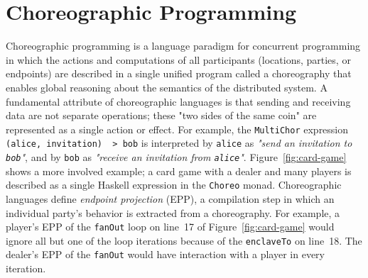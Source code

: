 \documentclass[sigplan,screen,review,anonymous]{acmart}
\newcommand{\inlinecode}[2][haskell]{\texttt{#2}}
\newcommand{\MultiChor}{\texttt{Multi\-Chor}\xspace}
\begin{document}
\section{Choreographic Programming}\label{sec:background}


Choreographic programming is a language paradigm for concurrent programming in which
the actions and computations of all participants (locations, parties, or endpoints)
are described in a single unified program called a choreography that enables global reasoning about the semantics of the distributed system.
A fundamental attribute of choreographic languages is that
sending and receiving data are not separate operations;
these "two sides of the same coin" are represented as a single action or effect.
For example, the \MultiChor expression
\inlinecode{(alice, invitation) ~> bob}
is interpreted by \inlinecode{alice} as \textit{"send an invitation to \inlinecode{bob}"},
and by \inlinecode{bob} as \textit{"receive an invitation from \inlinecode{alice}"}.
Figure~\ref{fig:card-game} shows a more involved example;
a card game with a dealer and many players is described as a single Haskell expression
in the \inlinecode{Choreo} monad.
Choreographic languages define \emph{endpoint projection} (EPP),
a compilation step in which an individual party's behavior is extracted from a choreography.
For example, a player's EPP of the \inlinecode{fanOut} loop on
line~17 of Figure~\ref{fig:card-game}
would ignore all but one of the loop iterations
because of the \inlinecode{enclaveTo} on line~18.
The dealer's EPP of the \inlinecode{fanOut} would have interaction with a player
in every iteration.
\end{document}

